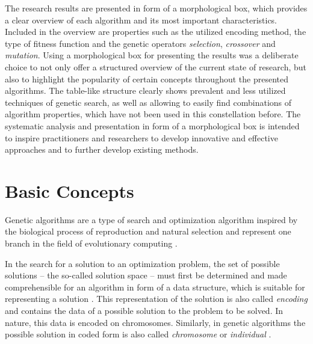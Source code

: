\documentclass[sigconf]{acmart}
\begin{document}
The research results are presented in form of a morphological box, which
provides a clear overview of each algorithm and its most important
characteristics.
Included in the overview are properties such as the utilized encoding method,
the type of fitness function and the genetic operators \textit{selection},
\textit{crossover} and \textit{mutation}.
%
Using a morphological box for presenting the results was a deliberate choice
to not only offer a structured overview of the current state of research,
but also to highlight the popularity of certain concepts throughout the
presented algorithms.
The table-like structure clearly shows prevalent and less utilized techniques
of genetic search, as well as allowing to easily find combinations of algorithm
properties, which have not been used in this constellation before.
%
The systematic analysis and presentation in form of a morphological box is
intended to inspire practitioners and researchers to develop innovative
and effective approaches and to further develop existing methods.



\section{Basic Concepts}
Genetic algorithms are a type of search and optimization algorithm inspired
by the biological process of reproduction and natural selection and represent
one branch in the field of evolutionary computing \cite{goldberg1989, Carr2014}.

In the search for a solution to an optimization problem, the set of possible
solutions -- the so-called solution space -- must first be determined and made
comprehensible for an algorithm in form of a data structure, which is suitable
for representing a solution \cite{Affenzeller2009}.
This representation of the solution is also called \textit{encoding} and
contains the data of a possible solution to the problem to be solved.
In nature, this data is encoded on chromosomes. Similarly, in genetic algorithms
the possible solution in coded form is also called \textit{chromosome} or
\textit{individual} \cite{Affenzeller2009}.
\end{document}
